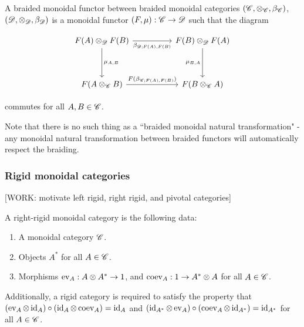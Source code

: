 \begin{definition} A braided monoidal functor between braided monoidal categories $(\mathscr{C},\otimes_{\mathscr{C}},\beta_{\mathscr{C}})$, $(\mathscr{D},\otimes_{\mathscr{D}},\beta_{\mathscr{D}})$ is a monoidal functor $(F,\mu):\mathscr{C}\to \mathscr{D}$ such that the diagram

\[\begin{tikzcd}
	{F(A)\otimes_{\Dcat}F(B)} && {F(B)\otimes_{\Dcat}F(A)} \\
	\\
	{F(A\otimes_{\C}B)} && {F(B\otimes_{\C}A)}
	\arrow["{\mu_{A,B}}", from=1-1, to=3-1]
	\arrow["{\beta_{\Dcat;F(A),F(B)}}"', from=1-1, to=1-3]
	\arrow["{\mu_{B,A}}"', from=1-3, to=3-3]
	\arrow["{F(\beta_{\C;F(A),F(B)})}", from=3-1, to=3-3]
\end{tikzcd}\]

commutes for all $A,B\in \mathscr{C}$.

\raggedleft\qedsymbol{}
\end{definition}

Note that there is no such thing as a ``braided monoidal natural transformation" - any monoidal natural transformation between braided functors will automatically respect the braiding. 

\subsubsection{Rigid monoidal categories}

[WORK: motivate left rigid, right rigid, and pivotal categories]

\begin{definition} A right-rigid monoidal category is the following data:

\begin{enumerate}
\item A monoidal category $\mathscr{C}$.
\item Objects $A^*$ for all $A\in \mathscr{C}$.
\item Morphisms $\operatorname{ev}_{A}: A\otimes A^*\to 1$, and $\operatorname{coev}_{A}: 1\to A^*\otimes A$ for all $A\in \mathscr{C}$.
\end{enumerate}

Additionally, a rigid category is required to satisfy the property that $(\operatorname{ev}_A \otimes \operatorname{id}_A)\circ (\operatorname{id}_A\otimes \operatorname{coev}_A)=\operatorname{id}_A$ and $(\operatorname{id}_{A^*}\otimes \operatorname{ev}_A)\circ (\operatorname{coev}_{A}\otimes \operatorname{id}_{A^*})=\operatorname{id}_{A^*}$ for all $A\in \mathscr{C}$. 

\raggedleft\qedsymbol{}
\end{definition}



